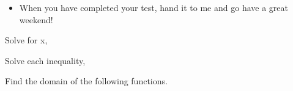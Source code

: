 \documentclass[12pt,letterpaper]{exam}
\begin{document}
\begin{itemize}

\item When you have completed your test, hand it to me and go have a great weekend!


\end{itemize}

\newpage

\begin{questions}
\addpoints
\question Solve for x,


\question Solve each inequality,




\newpage 
\addpoints
\question Find the domain of the following functions.


\end{questions}
\end{document}
